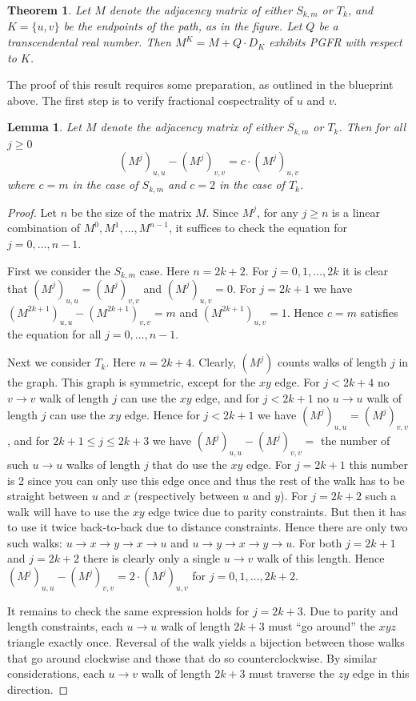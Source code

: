 \documentclass[11pt]{article}
\newtheorem{theorem}[theo]{Theorem}
\newtheorem{lemma}[theo]{Lemma}
\theoremstyle{definition}
\numberwithin{equation}{section}
\newcommand\+{\mkern2mu}
\newcommand{\1}{\mathbf 1}
\begin{document}
\begin{theorem}\label{thm:main_K2}
Let $M$ denote the adjacency matrix of either $S_{k,m}$ or $T_k$, and $K = \{u,v\}$ be the endpoints of the path, as in the figure. Let $Q$ be a transcendental real number. Then $M^K = M + Q \cdot D_K$ exhibits PGFR with respect to $K$.
\end{theorem}

The proof of this result requires some preparation, as outlined in the blueprint above. The first step is to verify fractional cospectrality of $u$ and $v$.

\begin{lemma}\label{lem:uv_cospectral}
Let $M$ denote the adjacency matrix of either $S_{k,m}$ or $T_k$. Then for all $j \geq 0$
\[ (M^j)_{u,u} - (M^j)_{v,v} = c \cdot (M^j)_{u,v} \]
where $c = m$ in the case of $S_{k,m}$ and $c = 2$ in the case of $T_k$. 
\end{lemma}

\begin{proof}
Let $n$ be the size of the matrix $M$. Since $M^j$, for any $j \geq n$ is a linear combination of $M^0, M^1, \dots, M^{n-1}$, it suffices to check the equation for $j=0,\dots, n-1$. 

First we consider the $S_{k,m}$ case. Here $n = 2k+2$. For $j=0,1,\dots,2k$ it is clear that $(M^j)_{u,u} = (M^j)_{v,v}$ and $(M^j)_{u,v} = 0$. For $j = 2k+1$ we have $(M^{2k+1})_{u,u} - (M^{2k+1})_{v,v} = m$ and $(M^{2k+1})_{u,v} = 1$. Hence $c=m$ satisfies the equation for all $j=0,\dots, n-1$. 

Next we consider $T_k$. Here $n = 2k+4$. Clearly, $(M^j)$ counts walks of length $j$ in the graph. This graph is symmetric, except for the $xy$ edge. For $j < 2k+4$ no $v \to v$ walk of length $j$ can use the $xy$ edge, and for $j < 2k+1$ no $u \to u$ walk of length $j$ can use the $xy$ edge. Hence for $j < 2k+1$ we have $(M^j)_{u,u} = (M^j)_{v,v}$, and for $2k+1 \leq j \leq 2k+3$ we have $(M^j)_{u,u} - (M^j)_{v,v} = $ the number of such $u\to u$ walks of length $j$ that do use the $xy$ edge.  For $j=2k+1$ this number is 2 since you can only use this edge once and thus the rest of the walk has to be straight between $u$ and $x$ (respectively between $u$ and $y$). For $j=2k+2$ such a walk will have to use the $xy$ edge twice due to parity constraints. But then it has to use it twice back-to-back due to distance constraints. Hence there are only two such walks: $u \to x \to y \to x \to u$ and $u \to y \to x \to y \to u$. For both $j=2k+1$ and $j=2k+2$ there is clearly only a single $u\to v$ walk of this length. Hence $(M^j)_{u,u} - (M^j)_{v,v} = 2 \cdot (M^j)_{u,v}$ for $j=0,1,\dots, 2k+2$. 

It remains to check the same expression holds for $j=2k+3$. Due to parity and length constraints, each $u\to u$ walk of length $2k+3$ must ``go around'' the $xyz$ triangle exactly once. Reversal of the walk yields a bijection between those walks that go around clockwise and those that do so counterclockwise. By similar considerations, each $u \to v$ walk of length $2k+3$ must traverse the $zy$ edge in this direction. 
\end{proof}
\end{document}
